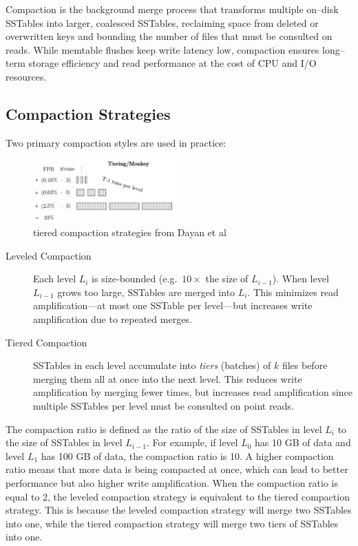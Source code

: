 \documentclass[sigconf]{acmart}
\begin{document}
      Compaction is the background merge process that transforms multiple on–disk SSTables into larger, coalesced SSTables, reclaiming space from deleted or overwritten keys and bounding the number of files that must be consulted on reads.  While memtable flushes keep write latency low, compaction ensures long–term storage efficiency and read performance at the cost of CPU and I/O resources.

      \subsection{Compaction Strategies}
      Two primary compaction styles are used in practice:

      \begin{figure}
        \centering
        \includegraphics[width=0.5\textwidth]{compaction_lsm.png}
        \caption{tiered compaction strategies from Dayan et al \cite{dayan2019log}}
        \label{fig:compaction_zhou:ways}
      \end{figure}

      \begin{description}
        \item[Leveled Compaction]
          Each level \(L_i\) is size‐bounded (e.g.\ \(10\times\) the size of \(L_{i-1}\)).  When level \(L_{i-1}\) grows too large, SSTables are merged into \(L_i\).  This minimizes read amplification—at most one SSTable per level—but increases write amplification due to repeated merges.
        \item[Tiered Compaction]
          SSTables in each level accumulate into \emph{tiers} (batches) of \(k\) files before merging them all at once into the next level.  This reduces write amplification by merging fewer times, but increases read amplification since multiple SSTables per level must be consulted on point reads.
      \end{description}

      The compaction ratio is defined as the ratio of the size of SSTables in level \(L_i\) to the size of SSTables in level \(L_{i-1}\).  For example, if level \(L_0\) has 10 GB of data and level \(L_1\) has 100 GB of data, the compaction ratio is 10.  A higher compaction ratio means that more data is being compacted at once, which can lead to better performance but also higher write amplification.
      When the compaction ratio is equal to 2, the leveled compaction strategy is equivalent to the tiered compaction strategy. This is because the leveled compaction strategy will merge two SSTables into one, while the tiered compaction strategy will merge two tiers of SSTables into one.
\end{document}
